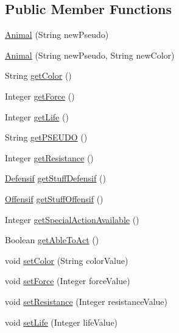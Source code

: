 \subsection*{Public Member Functions}
\begin{DoxyCompactItemize}
\item 
\hyperlink{classanimal_package_1_1_animal_af9ac4bd4d9d42913ffdf51a03d590b44}{Animal} (String new\+Pseudo)
\item 
\hyperlink{classanimal_package_1_1_animal_a7297a8c17c12bb30e0696da4f6087226}{Animal} (String new\+Pseudo, String new\+Color)
\item 
String \hyperlink{classanimal_package_1_1_animal_a15510acce4c89705599c66895d5794cc}{get\+Color} ()
\item 
Integer \hyperlink{classanimal_package_1_1_animal_aaec6fd7842858e7e68f4928639068ca7}{get\+Force} ()
\item 
Integer \hyperlink{classanimal_package_1_1_animal_a5aa0361400091f06e398d84e12941a09}{get\+Life} ()
\item 
String \hyperlink{classanimal_package_1_1_animal_af0394bd0a44e024fe043a20d73331be4}{get\+P\+S\+E\+U\+DO} ()
\item 
Integer \hyperlink{classanimal_package_1_1_animal_a5d6831cd59e4e834358ccf6101c386a2}{get\+Resistance} ()
\item 
\hyperlink{classstuff_1_1_defensif}{Defensif} \hyperlink{classanimal_package_1_1_animal_a094cbd594245e62d3ffda957b3eb406b}{get\+Stuff\+Defensif} ()
\item 
\hyperlink{classstuff_1_1_offensif}{Offensif} \hyperlink{classanimal_package_1_1_animal_a553be8b2b1f358cf68738dee71c407cf}{get\+Stuff\+Offensif} ()
\item 
Integer \hyperlink{classanimal_package_1_1_animal_ae1ab5c93920e45abc57ce6f888acb7ea}{get\+Special\+Action\+Available} ()
\item 
Boolean \hyperlink{classanimal_package_1_1_animal_a8ed0655a360df63722eea4b6e03bea9e}{get\+Able\+To\+Act} ()
\item 
void \hyperlink{classanimal_package_1_1_animal_a97be6f46aa44bfa52cfa8ca23b32b0c0}{set\+Color} (String color\+Value)
\item 
void \hyperlink{classanimal_package_1_1_animal_a9a42c1fc7fde44b3db48ad546d98860e}{set\+Force} (Integer force\+Value)
\item 
void \hyperlink{classanimal_package_1_1_animal_a796386be10ae4f6cecb77bb7e537e8c8}{set\+Resistance} (Integer resistance\+Value)
\item 
void \hyperlink{classanimal_package_1_1_animal_a40176f317d32b8b29817762d1b58259f}{set\+Life} (Integer life\+Value)

\end{DoxyCompactItemize}

